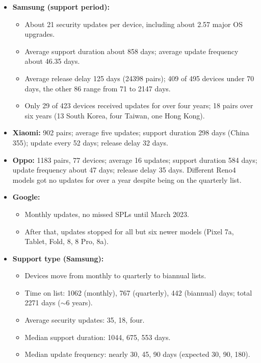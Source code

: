 \documentclass[11pt,a4paper]{article}
\begin{document}
\begin{enumerate}
    \begin{itemize}[leftmargin=*,itemsep=1pt,topsep=2pt]
        \item \textbf{Samsung (support period):}
        \begin{itemize}[itemsep=0pt]
            \item About 21 security updates per device, including about 2.57 major OS upgrades.
            \item Average support duration about 858 days; average update frequency about 46.35 days.
            \item Average release delay 125 days (24398 pairs); 409 of 495 devices under 70 days, the other 86 range from 71 to 2147 days.
            \item Only 29 of 423 devices received updates for over four years; 18 pairs over six years (13 South Korea, four Taiwan, one Hong Kong).
        \end{itemize}
        \item \textbf{Xiaomi:} 902 pairs; average five updates; support duration 298 days (China 355); update every 52 days; release delay 32 days.
        \item \textbf{Oppo:} 1183 pairs, 77 devices; average 16 updates; support duration 584 days; update frequency about 47 days; release delay 35 days. Different Reno4 models got no updates for over a year despite being on the quarterly list.
        \item \textbf{Google:}
        \begin{itemize}[itemsep=0pt]
            \item Monthly updates, no missed SPLs until March 2023.
            \item After that, updates stopped for all but six newer models (Pixel 7a, Tablet, Fold, 8, 8 Pro, 8a).
        \end{itemize}
        \item \textbf{Support type (Samsung):}
        \begin{itemize}[itemsep=0pt]
            \item Devices move from monthly to quarterly to biannual lists.
            \item Time on list: 1062 (monthly), 767 (quarterly), 442 (biannual) days; total 2271 days ($\sim$6 years).
            \item Average security updates: 35, 18, four.
            \item Median support duration: 1044, 675, 553 days.
            \item Median update frequency: nearly 30, 45, 90 days (expected 30, 90, 180).

\end{itemize}
\end{itemize}
\end{enumerate}
\end{document}
